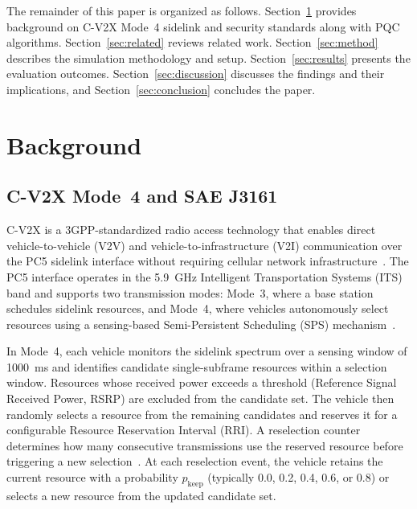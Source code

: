 \documentclass[letterpaper,journal]{IEEEtran}
\begin{document}
The remainder of this paper is organized as follows. Section~\ref{sec:background} provides background on C-V2X Mode~4 sidelink and security standards along with PQC algorithms. Section~\ref{sec:related} reviews related work. Section~\ref{sec:method} describes the simulation methodology and setup. Section~\ref{sec:results} presents the evaluation outcomes. Section~\ref{sec:discussion} discusses the findings and their implications, and Section~\ref{sec:conclusion} concludes the paper.

\section{Background}
\label{sec:background}

\subsection{C-V2X Mode~4 and SAE J3161}
\label{sec:cv2x}

C-V2X is a 3GPP-standardized radio access technology that enables direct vehicle-to-vehicle (V2V) and vehicle-to-infrastructure (V2I) communication over the PC5 sidelink interface without requiring cellular network infrastructure~\cite{3gpp_36213}. The PC5 interface operates in the 5.9~GHz Intelligent Transportation Systems (ITS) band and supports two transmission modes: Mode~3, where a base station schedules sidelink resources, and Mode~4, where vehicles autonomously select resources using a sensing-based Semi-Persistent Scheduling (SPS) mechanism~\cite{molina2017lte}.

In Mode~4, each vehicle monitors the sidelink spectrum over a sensing window of 1000~ms and identifies candidate single-subframe resources within a selection window. Resources whose received power exceeds a threshold (Reference Signal Received Power, RSRP) are excluded from the candidate set. The vehicle then randomly selects a resource from the remaining candidates and reserves it for a configurable Resource Reservation Interval (RRI). A reselection counter determines how many consecutive transmissions use the reserved resource before triggering a new selection~\cite{3gpp_36321}. At each reselection event, the vehicle retains the current resource with a probability $p_\text{keep}$ (typically 0.0, 0.2, 0.4, 0.6, or 0.8) or selects a new resource from the updated candidate set.
\end{document}
